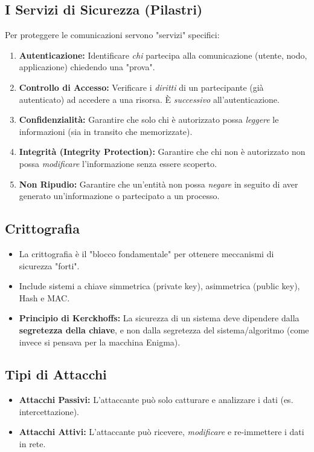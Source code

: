 \documentclass[a4paper,12pt]{article}
\begin{document}
\begin{itemize}
\subsection{I Servizi di Sicurezza (Pilastri)}
Per proteggere le comunicazioni servono "servizi" specifici:
\begin{enumerate}
    \item \textbf{Autenticazione:} Identificare \emph{chi} partecipa alla comunicazione (utente, nodo, applicazione) chiedendo una "prova".
    \item \textbf{Controllo di Accesso:} Verificare i \emph{diritti} di un partecipante (già autenticato) ad accedere a una risorsa. È \emph{successivo} all'autenticazione.
    \item \textbf{Confidenzialità:} Garantire che solo chi è autorizzato possa \emph{leggere} le informazioni (sia in transito che memorizzate).
    \item \textbf{Integrità (Integrity Protection):} Garantire che chi non è autorizzato non possa \emph{modificare} l'informazione senza essere scoperto.
    \item \textbf{Non Ripudio:} Garantire che un'entità non possa \emph{negare} in seguito di aver generato un'informazione o partecipato a un processo.
\end{enumerate}

\subsection{Crittografia}
\begin{itemize}
    \item La crittografia è il "blocco fondamentale" per ottenere meccanismi di sicurezza "forti".
    \item Include sistemi a chiave simmetrica (private key), asimmetrica (public key), Hash e MAC.
  \item \textbf{Principio di Kerckhoffs:} La sicurezza di un sistema deve dipendere dalla \textbf{segretezza della chiave}, e non dalla segretezza del sistema/algoritmo (come invece si pensava per la macchina Enigma).
\end{itemize}

\subsection{Tipi di Attacchi}
\begin{itemize}
    \item \textbf{Attacchi Passivi:} L'attaccante può solo catturare e analizzare i dati (es. intercettazione).
    \item \textbf{Attacchi Attivi:} L'attaccante può ricevere, \emph{modificare} e re-immettere i dati in rete.
\end{itemize}


\end{itemize}
\end{document}
